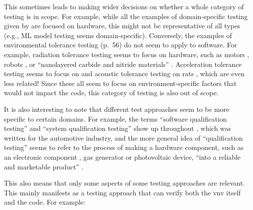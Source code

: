 This sometimes leads to making wider decisions on whether a whole category of
testing is in scope. For example, while all the examples of domain-specific
testing given by \citet[p.~26]{Firesmith2015} are focused on hardware, this
might not be representative of all types (e.g., ML model testing seems
domain-specific). Conversely, the examples of environmental tolerance testing
(p.~56) do not seem to apply to software. For example, radiation tolerance
testing seems to focus on hardware, such as motors \citep{MukhinEtAl2022},
robots \citep{ZhangEtAl2020}, or ``nanolayered carbide and nitride materials''
\citep[p.~1]{TunesEtAl2022}. Acceleration tolerance testing seems to focus on
\accelTolTest{} and acoustic tolerance testing on rats \citep{HolleyEtAl1996},
which are even less related! Since these all seem to focus on
environment-specific factors that would not impact the code, this category of
testing is also out of scope.

It is also interesting to note that different test approaches seem to be more
specific to certain domains. For example, the terms ``software qualification
testing'' and ``system qualification testing'' show up throughout
\citep{SPICE2022}, which was written for the automotive industry, and the more
general idea of ``qualification testing'' seems to refer to the process of
making a hardware component, such as an electronic component
\citep{AhsanEtAl2020}, gas generator \citep{ParateEtAl2021} or photovoltaic
device, ``into a reliable and marketable product'' \citep[p.~1]{SuhirEtAl2013}.

This also means that only some aspects of some testing approaches are relevant.
This mainly manifests as a testing approach that can verify both the \acs{vnv}
itself and the code. For example:

